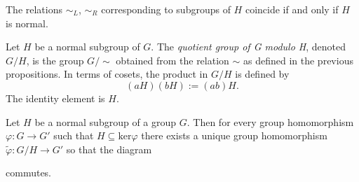 \begin{proposition}
The relations $\sim_L$, $\sim_R$ corresponding to subgroups of $H$ coincide if and only if $H$ is normal.
\end{proposition}

\label{definitionofquotientgroup}

Let $H$ be a normal subgroup of $G$. The \emph{quotient group of G modulo H}, denoted $G/H$, is the group $G/\sim$
obtained from the relation $\sim$ as defined in the previous propositions. In terms of cosets, the product in $G/H$
is defined by
$$(aH)(bH) := (ab)H.$$
The identity element is $H$.

\label{universalpropertyofquotientgroups}
\begin{theorem}
Let $H$ be a normal subgroup of a group $G$. Then for every group homomorphism $\varphi : G \rightarrow G'$ such that
$H \subseteq \textrm{ker} \varphi$ there exists a unique group homomorphism $\tilde \varphi: G/H \rightarrow G'$ so that
the diagram

\begin{figure}[H]
\centering

\end{figure}

\noindent commutes.
\end{theorem}
